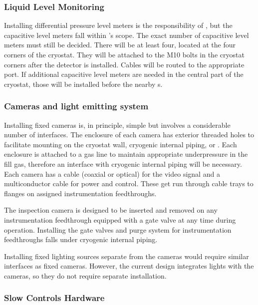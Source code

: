\subsubsection{Liquid Level Monitoring}
\label{sec:fdgen-slow-cryo-install-llm}

Installing differential pressure level meters is the responsibility of , but the capacitive level meters fall within 's scope. The exact number of capacitive level meters must still be decided. There will be at least four, located at the four corners of the cryostat. 
They will be attached to the M10 bolts in the cryostat corners after the detector is installed. Cables will be routed to the appropriate  port. If additional capacitive level meters are needed in the central part of the cryostat, those will be installed before the nearby s. 

\subsubsection{Cameras and light emitting system}
\label{sec:fdgen-slow-cryo-install-c}

Installing fixed cameras is, in principle, simple but involves a
considerable number of interfaces. The enclosure of each camera has
exterior threaded holes to facilitate mounting on the cryostat wall,
cryogenic internal piping, or . Each
enclosure %
is attached to a gas line to maintain appropriate
underpressure in the fill gas, %
therefore an interface with cryogenic
internal piping will be necessary. Each camera has a cable (coaxial or
optical) for the video signal and a multiconductor cable for power and
control. These %
get run through cable trays to flanges on assigned
instrumentation feedthroughs.

The inspection camera is designed to be inserted and removed on any
instrumentation feedthrough equipped with a gate valve at any time
during operation.  Installing the gate valves and purge system
for instrumentation feedthroughs falls under cryogenic internal
piping.

Installing fixed lighting sources separate from the cameras would
require similar interfaces as fixed cameras.  However, the current
design integrates lights with the cameras, so they do not require separate
installation.



\subsubsection{Slow Controls Hardware}
\label{sec:fdgen-slow-cryo-install-sc-hard}

